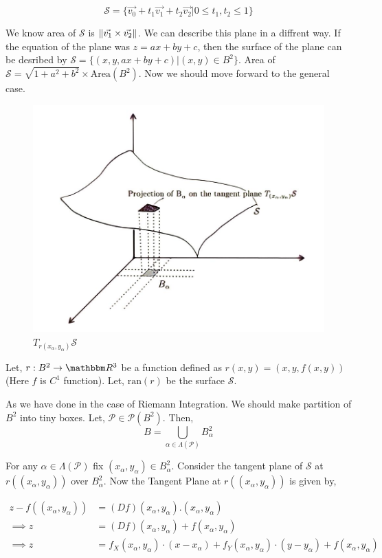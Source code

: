 \documentclass[../Analysis-3]{subfiles}
\begin{document}
$$ \mathcal{S} = \{ \vec{v_0} + t_1 \vec{v_1} +t_2 \vec{v_2}  |  0 \le t_1,t_2 \le 1\} $$

We know area of $\mathcal{S}$ is $\norm{\vec{v_1}\times \vec{v_2}}$. We can describe this plane in a diffrent way. If the equation of the plane  was $z=ax+by+c$, then the surface of the plane can be desribed by $\mathcal{S} = \{(x , y, ax+by+c) | (x,y) \in B^2 \}$. Area of $\mathcal{S} = \sqrt{1+a^2+b^2} \times \text{Area}(B^2)$. Now we should move forward to the general case.

\begin{figure}
    \centering
    \includegraphics[width=.78\linewidth]{../figures/lec-25.2.png}
    \caption{$T_{r(x_{\alpha},y_{\alpha})} \mathcal{S}$}
\end{figure}


Let, $r : B^2 \to \R^3$ be a function defined as $r(x,y) = (x,y,f(x,y))$ (Here $f$ is $C^1$ function). Let, $\text{ran}(r)$ be the surface $\mathcal{S}$.

\vspace{0.2cm}

As we have done in the case of Riemann Integration. We should make partition of $B^2$ into tiny boxes.  Let, $\mathcal{P} \in \mathscr{P}(B^2)$. Then,
\[B = \bigcup_{\alpha \in \Lambda(\mathcal{P})} B_{\alpha}^2\]

For any $\alpha \in \Lambda(\mathcal{P})$ fix $(x_{\alpha},y_{\alpha}) \in B_{\alpha}^2$. Consider the tangent plane of $\mathcal{S}$ at $r((x_{\alpha},y_{\alpha}))$ over $B_{\alpha}^2$. Now the Tangent Plane at $r((x_{\alpha},y_{\alpha}))$ is given by,

\begin{align*}
    z - f((x_{\alpha},y_{\alpha})) & = (Df)(x_{\alpha},y_{\alpha}).(x_{\alpha},y_{\alpha})                                                                             \\
    \implies z                     & = (Df)(x_{\alpha},y_{\alpha}) + f(x_{\alpha},y_{\alpha})                                                                          \\
    \implies z                     & = f_X(x_{\alpha},y_{\alpha}) \cdot (x - x_{\alpha}) +f_Y(x_{\alpha},y_{\alpha}) \cdot (y - y_{\alpha}) + f(x_{\alpha},y_{\alpha}) \\
\end{align*}
\end{document}
